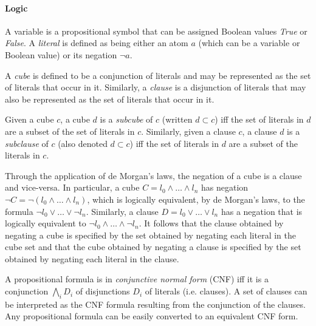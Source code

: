 \documentclass[12pt,a4paper,twoside,openright]{report}
\begin{document}
\paragraph{Logic}{
A variable is a propositional symbol that can be assigned Boolean values {\it True}
or {\it False}. A \emph{literal} is defined as being either an atom $a$ (which can
be a variable or Boolean value) or its negation $\neg a$.

A \emph{cube} is defined to be a conjunction of literals and may be represented as the set
of literals that occur in it. Similarly, a \emph{clause} is a disjunction of literals that
may also be represented as the set of literals that occur in it.

Given a cube $c$, a cube $d$ is a \emph{subcube} of $c$ (written $d \subset c$)
iff the set of literals in $d$ are a subset of the set of literals in $c$.
Similarly, given a clause $c$, a clause $d$ is a \emph{subclause} of $c$ (also
denoted $d \subset c$) iff the set of literals in $d$ are a subset of
the literals in $c$.

Through the application of de Morgan's laws, the negation of a cube is a clause and
vice-versa. In particular, a cube $C = l_0 \wedge \ldots \wedge l_n$ has negation
$\neg C = \neg (l_0 \wedge \ldots \wedge l_n)$, which is logically equivalent,
by de Morgan's laws, to the formula $\neg l_0 \vee \ldots \vee \neg l_n$.
Similarly, a clause $D = l_0 \vee \ldots \vee l_n$ has a negation that is
logically equivalent to $\neg l_0 \wedge \ldots \wedge \neg l_n$. It follows
that the clause obtained by negating a cube is specified by the set obtained
by negating each literal in the cube set and that the cube obtained by negating
a clause is specified by the set obtained by negating each literal in the clause.

A propositional formula is in \emph{conjunctive normal form} (CNF) iff it is a conjunction 
$\bigwedge_i D_i$ of disjunctions $D_i$ of literals (i.e. clauses). A set of clauses
can be interpreted as the CNF formula resulting from the conjunction
of the clauses. Any propositional formula can be easily converted to an equivalent CNF
form.}
\end{document}
